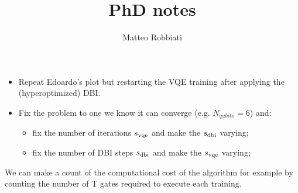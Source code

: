\documentclass[11pt]{article}
\title{PhD notes}
\author{Matteo Robbiati}
\date{}
\begin{document}
\begin{itemize}
\item Repeat Edoardo's plot but restarting the VQE training after applying the (hyperoptimized)
        DBI.
\item Fix the problem to one we know it can converge (e.g. $N_{qubits}=6$) and:
\begin{itemize}
\item fix the number of iterations $s_{\rm vqe}$ and make the $s_{\rm dbi}$ varying;
\item fix the number of DBI steps $s_{\rm dbi}$ and make the $s_{\rm vqe}$ varying;
\end{itemize}
\end{itemize}
We can make a count of the computational cost of the algorithm for example by counting 
the number of T gates required to execute each training.
\end{document}
